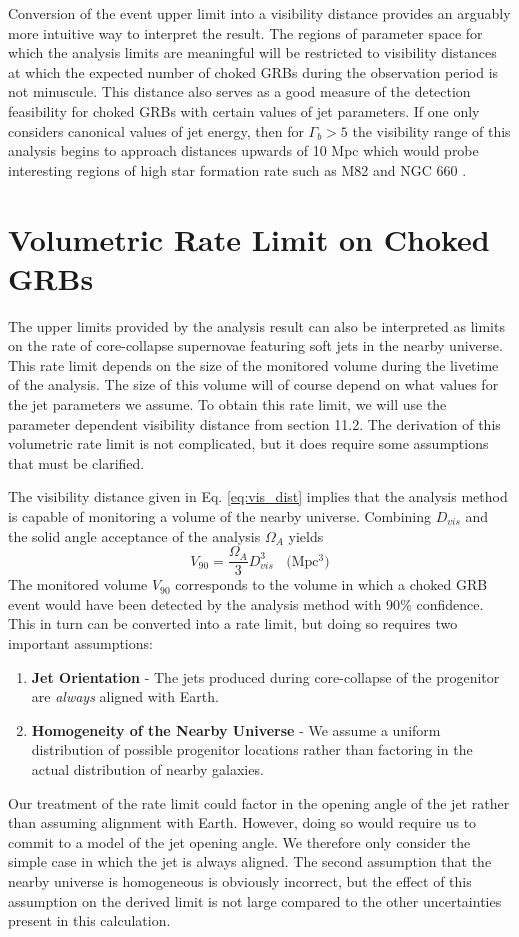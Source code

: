 \documentclass{gatech-thesis}
\begin{document}
Conversion of the event upper limit into a visibility distance provides an arguably more intuitive way to interpret the result. The regions of parameter space for which the analysis limits are meaningful will be restricted to visibility distances at which the expected number of choked GRBs during the observation period is not minuscule. This distance also serves as a good measure of the detection feasibility for choked GRBs with certain values of jet parameters. If one only considers canonical values of jet energy, then for $\Gamma_b > 5$ the visibility range of this analysis begins to approach distances upwards of 10 Mpc which would probe interesting regions of high star formation rate such as M82 \cite{1979AN....300..181K} and NGC 660 \cite{1995AJ....109..942V}.

\section{Volumetric Rate Limit on Choked GRBs}
The upper limits provided by the analysis result can also be interpreted as limits on the rate of core-collapse supernovae featuring soft jets in the nearby universe. This rate limit depends on the size of the monitored volume during the livetime of the analysis. The size of this volume will of course depend on what values for the jet parameters we assume. To obtain this rate limit, we will use the parameter dependent visibility distance from section 11.2. The derivation of this volumetric rate limit is not complicated, but it does require some assumptions that must be clarified.

The visibility distance given in Eq. \ref{eq:vis_dist} implies that the analysis method is capable of monitoring a volume of the nearby universe. Combining $D_{vis}$ and the solid angle acceptance of the analysis $\Omega_A$ yields
\begin{equation}\label{eq:vis_vol}
V_{90} = \frac{\Omega_{A}}{3}D_{vis}^{3} \: \: \: \: \text{(Mpc$^3$)}
\end{equation}
The monitored volume $V_{90}$ corresponds to the volume in which a choked GRB event would have been detected by the analysis method with 90$\%$ confidence. This in turn can be converted into a rate limit, but doing so requires two important assumptions:
\begin{enumerate}
\item \textbf{Jet Orientation} - The jets produced during core-collapse of the progenitor are \textit{always} aligned with Earth.
\item \textbf{Homogeneity of the Nearby Universe} - We assume a uniform distribution of possible progenitor locations rather than factoring in the actual distribution of nearby galaxies.
\end{enumerate}
Our treatment of the rate limit could factor in the opening angle of the jet rather than assuming alignment with Earth. However, doing so would require us to commit to a model of the jet opening angle. We therefore only consider the simple case in which the jet is always aligned. The second assumption that the nearby universe is homogeneous is obviously incorrect, but the effect of this assumption on the derived limit is not large compared to the other uncertainties present in this calculation.
\end{document}
